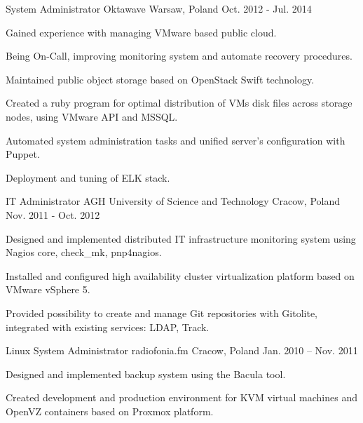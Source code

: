 \begin{cventries}
  \cventry
    {System Administrator} %
    {Oktawave} %
    {Warsaw, Poland} %
    {Oct. 2012 - Jul. 2014} %
    {
      \begin{cvitems} %
        \item {Gained experience with managing VMware based public cloud.}
        \item {Being On-Call, improving monitoring system and automate recovery procedures.}
        \item {Maintained public object storage based on OpenStack Swift technology.}
        \item {Created a ruby program for optimal distribution of VMs disk files across storage nodes, using VMware API and MSSQL.}
        \item {Automated system administration tasks and unified server's configuration with Puppet.}
        \item {Deployment and tuning of ELK stack.}
      \end{cvitems}
    }

  \cventry
    {IT Administrator} %
    {AGH University of Science and Technology} %
    {Cracow, Poland} %
    {Nov. 2011 - Oct. 2012} %
    {
      \begin{cvitems} %
        \item {Designed and implemented distributed IT infrastructure monitoring system using Nagios core, check\_mk, pnp4nagios.}
        \item {Installed and configured high availability cluster virtualization platform based on VMware vSphere 5.}
        \item {Provided possibility to create and manage Git repositories with Gitolite, integrated with existing services: LDAP, Track.}
      \end{cvitems}
    }

  \cventry
    {Linux System Administrator} %
    {radiofonia.fm} %
    {Cracow, Poland} %
    {Jan. 2010 – Nov. 2011} %
    {
      \begin{cvitems} %
        \item {Designed and implemented backup system using the Bacula tool.}
        \item {Created development and production environment for KVM virtual machines and OpenVZ containers based on Proxmox platform.}
      \end{cvitems}
    }

\end{cventries}
